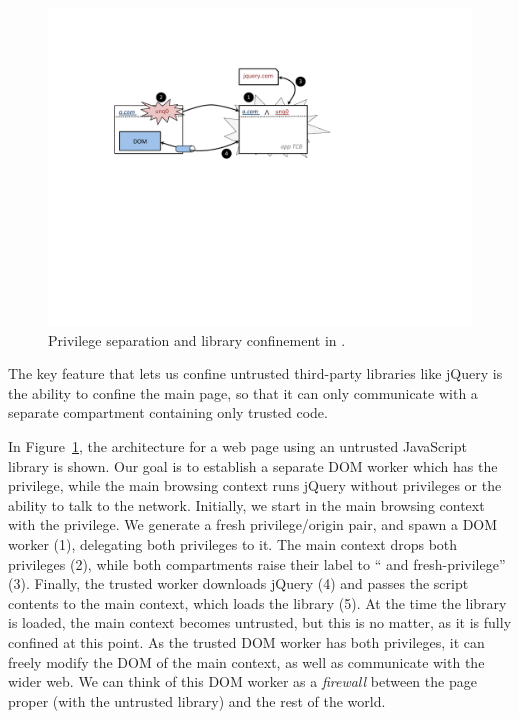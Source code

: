 \begin{figure}
\centerline{\includegraphics[width=\columnwidth]{jquery}}
\caption{\label{fig:jquery} Privilege separation and library
confinement in \sys{}.}
\end{figure}

The key feature that lets us confine untrusted third-party libraries
like jQuery is the ability to confine the main page, so that it can
only communicate with a separate compartment containing only trusted code.

In Figure~\ref{fig:jquery}, the architecture for a web page using an
untrusted JavaScript library is shown.  Our goal is to establish a
separate DOM worker which has the  privilege, while the
main browsing context runs jQuery without privileges or the ability to
talk to the network.  Initially, we start in the main browsing context
with the  privilege.  We generate a fresh privilege/origin
pair, and spawn a DOM worker (1), delegating both privileges to it.  The
main context drops both privileges (2), while both compartments raise
their label to `` and fresh-privilege'' (3).  Finally, the
trusted worker downloads jQuery (4) and passes the script contents to
the main context, which loads the library (5).  At the time the library
is loaded, the main context becomes untrusted, but this is no matter, as
it is fully confined at this point.  As the trusted DOM worker has both
privileges, it can freely modify the DOM of the main context, as well as
communicate with the wider web.  We can think of this DOM worker as a
\emph{firewall} between the page proper (with the untrusted library)
and the rest of the world.
